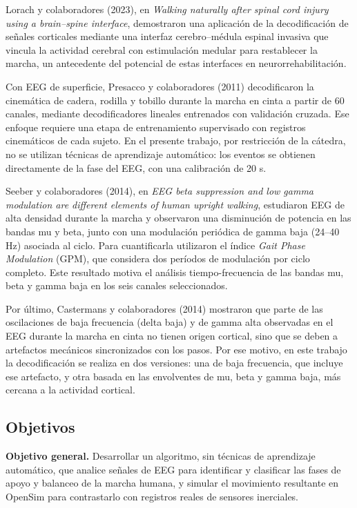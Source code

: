 \documentclass[10pt]{article}
\begin{document}
Lorach y colaboradores (2023), en \textit{Walking naturally after spinal cord injury using a brain--spine interface}, demostraron una aplicación de la decodificación de señales corticales mediante una interfaz cerebro--médula espinal invasiva que vincula la actividad cerebral con estimulación medular para restablecer la marcha, un antecedente del potencial de estas interfaces en neurorrehabilitación.

Con EEG de superficie, Presacco y colaboradores (2011) decodificaron la cinemática de cadera, rodilla y tobillo durante la marcha en cinta a partir de 60 canales, mediante decodificadores lineales entrenados con validación cruzada. Ese enfoque requiere una etapa de entrenamiento supervisado con registros cinemáticos de cada sujeto. En el presente trabajo, por restricción de la cátedra, no se utilizan técnicas de aprendizaje automático: los eventos se obtienen directamente de la fase del EEG, con una calibración de 20 s.

Seeber y colaboradores (2014), en \textit{EEG beta suppression and low gamma modulation are different elements of human upright walking}, estudiaron EEG de alta densidad durante la marcha y observaron una disminución de potencia en las bandas mu y beta, junto con una modulación periódica de gamma baja (24--40 Hz) asociada al ciclo. Para cuantificarla utilizaron el índice \textit{Gait Phase Modulation} (GPM), que considera dos períodos de modulación por ciclo completo. Este resultado motiva el análisis tiempo-frecuencia de las bandas mu, beta y gamma baja en los seis canales seleccionados.

Por último, Castermans y colaboradores (2014) mostraron que parte de las oscilaciones de baja frecuencia (delta baja) y de gamma alta observadas en el EEG durante la marcha en cinta no tienen origen cortical, sino que se deben a artefactos mecánicos sincronizados con los pasos. Por ese motivo, en este trabajo la decodificación se realiza en dos versiones: una de baja frecuencia, que incluye ese artefacto, y otra basada en las envolventes de mu, beta y gamma baja, más cercana a la actividad cortical.


\subsection{Objetivos}

\textbf{Objetivo general.} Desarrollar un algoritmo, sin técnicas de aprendizaje automático, que analice señales de EEG para identificar y clasificar las fases de apoyo y balanceo de la marcha humana, y simular el movimiento resultante en OpenSim para contrastarlo con registros reales de sensores inerciales.
\end{document}
